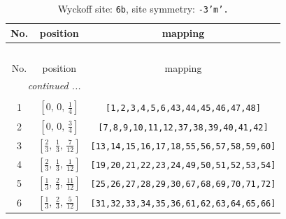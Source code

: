 \documentclass[fleqn,8pt]{jsarticle}
\begin{document}
\begin{longtable}{ccc}
\caption{Wyckoff site: {\tt 6b}, site symmetry: {\tt -3'm'.}}
 \\
 \hline \hline
No. & position & mapping \\ \hline \endfirsthead

\multicolumn{2}{l}{\tablename\ \thetable{}} \\
 \hline \hline
No. & position & mapping \\ \hline \endhead

 \hline \hline
\multicolumn{2}{r}{\footnotesize\it continued ...} \\ \endfoot

 \hline \hline
\multicolumn{2}{r}{} \\ \endlastfoot

1 & $\left[ 0,\, 0,\, \frac{1}{4} \right]$ & {\tt [1,2,3,4,5,6,43,44,45,46,47,48]} \\ \hline
2 & $\left[ 0,\, 0,\, \frac{3}{4} \right]$ & {\tt [7,8,9,10,11,12,37,38,39,40,41,42]} \\ \hline
3 & $\left[ \frac{2}{3},\, \frac{1}{3},\, \frac{7}{12} \right]$ & {\tt [13,14,15,16,17,18,55,56,57,58,59,60]} \\ \hline
4 & $\left[ \frac{2}{3},\, \frac{1}{3},\, \frac{1}{12} \right]$ & {\tt [19,20,21,22,23,24,49,50,51,52,53,54]} \\ \hline
5 & $\left[ \frac{1}{3},\, \frac{2}{3},\, \frac{11}{12} \right]$ & {\tt [25,26,27,28,29,30,67,68,69,70,71,72]} \\ \hline
6 & $\left[ \frac{1}{3},\, \frac{2}{3},\, \frac{5}{12} \right]$ & {\tt [31,32,33,34,35,36,61,62,63,64,65,66]} \\
\end{longtable}
\renewcommand{\arraystretch}{1.2}
\end{document}
